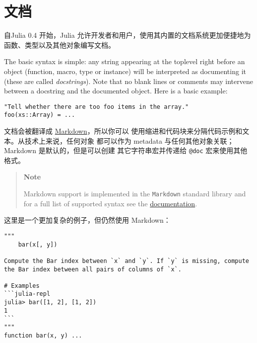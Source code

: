 \hypertarget{11221734891767592985}{}


\chapter{文档}



自Julia 0.4 开始，Julia 允许开发者和用户，使用其内置的文档系统更加便捷地为函数、类型以及其他对象编写文档。



The basic syntax is simple: any string appearing at the toplevel right before an object (function, macro, type or instance) will be interpreted as documenting it (these are called \emph{docstrings}). Note that no blank lines or comments may intervene between a docstring and the documented object. Here is a basic example:




\begin{verbatim}
"Tell whether there are too foo items in the array."
foo(xs::Array) = ...
\end{verbatim}



文档会被翻译成 \href{https://en.wikipedia.org/wiki/Markdown}{Markdown}，所以你可以 使用缩进和代码块来分隔代码示例和文本。从技术上来说，任何对象 都可以作为 metadata 与任何其他对象关联；Markdown 是默认的，但是可以创建 其它字符串宏并传递给 \texttt{@doc} 宏来使用其他格式。



\begin{quote}
\textbf{Note}

Markdown support is implemented in the \texttt{Markdown} standard library and for a full list of supported syntax see the \hyperlink{4003493111480691691}{documentation}.

\end{quote}


这里是一个更加复杂的例子，但仍然使用 Markdown：




\begin{verbatim}
"""
    bar(x[, y])

Compute the Bar index between `x` and `y`. If `y` is missing, compute
the Bar index between all pairs of columns of `x`.

# Examples
```julia-repl
julia> bar([1, 2], [1, 2])
1
```
"""
function bar(x, y) ...
\end{verbatim}



